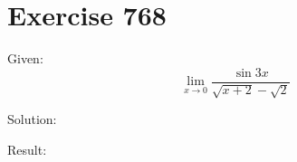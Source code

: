 \documentclass[a4paper, 10pt]{scrartcl}
\begin{document}
\section{Exercise 768}

Given:
\[\lim_{x\to 0}{\frac{\sin{3x}}{\sqrt{x + 2} - \sqrt{2}}}\]

Solution:

Result:
\end{document}
